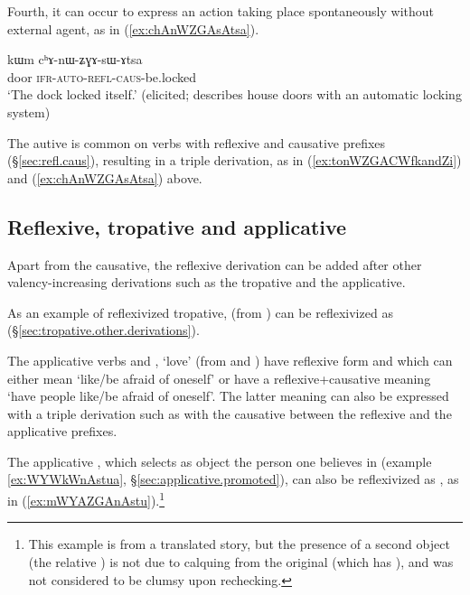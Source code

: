 Fourth, it can occur to express an action taking place spontaneously without external agent, as in (\ref{ex:chAnWZGAsAtsa}).

\begin{exe}
\ex \label{ex:chAnWZGAsAtsa}
\gll  kɯm cʰɤ-nɯ-ʑɣɤ-sɯ-ɤtsa \\
door \textsc{ifr}-\textsc{auto}-\textsc{refl}-\textsc{caus}-be.locked \\
\glt `The dock locked itself.' (elicited; describes house doors with an automatic locking system)
\end{exe}

The autive is common on verbs with reflexive and causative prefixes (§\ref{sec:refl.caus}), resulting in a triple derivation, as in (\ref{ex:tonWZGACWfkandZi}) and (\ref{ex:chAnWZGAsAtsa}) above.

 \subsection{Reflexive, tropative and applicative} \label{sec:refl.tropative}
Apart from the causative, the reflexive derivation can be added after other valency-increasing derivations such as the tropative and the applicative. 

As an example of reflexivized tropative,  (from ) can be reflexivized as  (§\ref{sec:tropative.other.derivations}).

The applicative verbs  and , `love' (from  and ) have reflexive form  and   which can either mean `like/be afraid of oneself' or have a reflexive+causative meaning `have people like/be afraid of oneself'. The latter meaning can also be expressed with a triple derivation such as   with the causative  between the reflexive and the applicative prefixes.

The applicative , which selects as object the person one believes in (example \ref{ex:WYWkWnAstua}, §\ref{sec:applicative.promoted}), can also be reflexivized as , as in (\ref{ex:mWYAZGAnAstu}).\footnote{This example is from a translated story, but the presence of a second object (the relative ) is not due to calquing from the original (which has ), and was not considered to be clumsy upon rechecking. }

